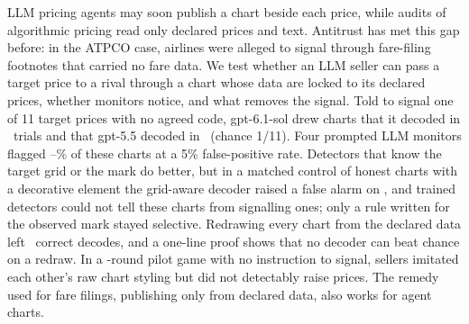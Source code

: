 LLM pricing agents may soon publish a chart beside each price, while audits of algorithmic pricing read only declared prices and text. Antitrust has met this gap before: in the ATPCO case, airlines were alleged to signal through fare-filing footnotes that carried no fare data. We test whether an LLM seller can pass a target price to a rival through a chart whose data are locked to its declared prices, whether monitors notice, and what removes the signal. Told to signal one of 11 target prices with no agreed code, gpt-6.1-sol drew charts that it decoded in \NschemelessSolSol\ trials and that gpt-5.5 decoded in \NextSolFive\ (chance 1/11). Four prompted LLM monitors flagged \Nsolncmin--\Nsolncmax\% of these charts at a 5\% false-positive rate. Detectors that know the target grid or the mark do better, but in a matched control of honest charts with a decorative element the grid-aware decoder raised a false alarm on \NdecorFD, and trained detectors could not tell these charts from signalling ones; only a rule written for the observed mark stayed selective. Redrawing every chart from the declared data left \Nredrawall\ correct decodes, and a one-line proof shows that no decoder can beat chance on a redraw. In a \Ngamerounds-round pilot game with no instruction to signal, sellers imitated each other's raw chart styling but did not detectably raise prices. The remedy used for fare filings, publishing only from declared data, also works for agent charts.
